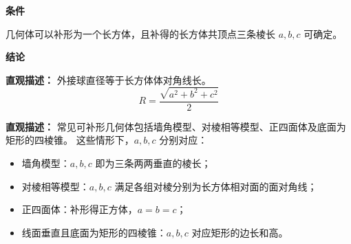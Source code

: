 \begin{statementbox}
	\textbf{\textcolor{CStatement}{条件}}
	\begin{description}[style=nextline, leftmargin=2.8em, labelsep=0.5em, itemsep=0.35em]
		\item[\textbf{\textcolor{CStatement}{条件1（几何可补）：}}] 几何体可以补形为一个长方体，且补得的长方体共顶点三条棱长 $a,b,c$ 可确定。
	\end{description}

	\textbf{\textcolor{CStatement}{结论}}
	\begin{description}[style=nextline, leftmargin=2.8em, labelsep=0.5em, itemsep=0.45em]
		\item[\textbf{\textcolor{CStatement}{结论一（外接球半径）：}}]
			\textbf{\textcolor{CStatement}{直观描述：}}
			外接球直径等于长方体体对角线长。
			\[
				R = \frac{\sqrt{a^{2}+b^{2}+c^{2}}}{2}
			\]

		\item[\textbf{\textcolor{CStatement}{推广结论（常见情形）：}}]
			\textbf{\textcolor{CStatement}{直观描述：}}
			常见可补形几何体包括墙角模型、对棱相等模型、正四面体及底面为矩形的四棱锥。
			这些情形下，$a,b,c$ 分别对应：
			\begin{itemize}
			\item 墙角模型：$a,b,c$ 即为三条两两垂直的棱长；
			\item 对棱相等模型：$a,b,c$ 满足各组对棱分别为长方体相对面的面对角线；
			\item 正四面体：补形得正方体，$a=b=c$；
			\item 线面垂直且底面为矩形的四棱锥：$a,b,c$ 对应矩形的边长和高。
		\end{itemize}
	\end{description}
\end{statementbox}
